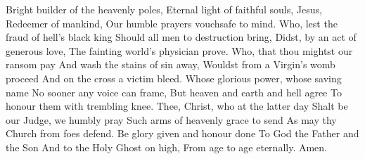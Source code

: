 Bright builder of the heavenly poles,
Eternal light of faithful souls,
Jesus, Redeemer of mankind,
Our humble prayers vouchsafe to mind.
\vskip 1mm
Who, lest the fraud of hell’s black king
Should all men to destruction bring,
Didst, by an act of generous love,
The fainting world’s physician prove.
\vskip 1mm
Who, that thou mightst our ransom pay
And wash the stains of sin away,
Wouldst from a Virgin’s womb proceed
And on the cross a victim bleed.
\vskip 1mm
Whose glorious power, whose saving name
No sooner any voice can frame,
But heaven and earth and hell agree
To honour them with trembling knee.
\vskip 1mm
Thee, Christ, who at the latter day
Shalt be our Judge, we humbly pray
Such arms of heavenly grace to send
As may thy Church from foes defend.
\vskip 1mm
Be glory given and honour done
To God the Father and the Son
And to the Holy Ghost on high,
From age to age eternally. Amen.